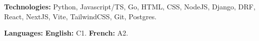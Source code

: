

\begin{cvpubs}

  \cvpub
    {
      \begin{cvlist}
        \item{\textbf{Technologies:} Python, Javascript/TS, Go, HTML, CSS, NodeJS, Django, DRF, React, NextJS, Vite, TailwindCSS, Git, Postgres. }
        \item{\textbf{Languages:} \textbf{English:} C1. \textbf{French:} A2. }
      \end{cvlist}
    }\vspace{-4pt}
\end{cvpubs}